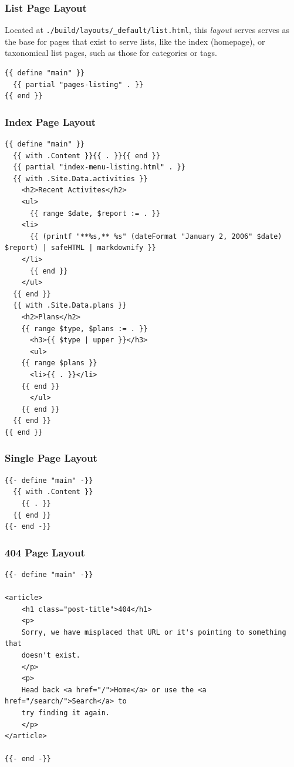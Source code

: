 \documentclass[11pt]{article}
\begin{document}
\subsubsection*{List Page Layout}
\label{sec:org9b11226}
Located at \texttt{./build/layouts/\_default/list.html}, this \emph{layout} serves
serves as the base for pages that exist to serve lists, like the index
(homepage), or taxonomical list pages, such as those for categories or
tags.
\begin{verbatim}
{{ define "main" }}
  {{ partial "pages-listing" . }}
{{ end }}
\end{verbatim}
\subsubsection*{Index Page Layout}
\label{sec:orge6c3772}
\begin{verbatim}
{{ define "main" }}
  {{ with .Content }}{{ . }}{{ end }}
  {{ partial "index-menu-listing.html" . }}
  {{ with .Site.Data.activities }}
    <h2>Recent Activites</h2>
    <ul>
      {{ range $date, $report := . }}
	<li>
	  {{ (printf "**%s,** %s" (dateFormat "January 2, 2006" $date) $report) | safeHTML | markdownify }}
	</li>
      {{ end }}
    </ul>
  {{ end }}
  {{ with .Site.Data.plans }}
    <h2>Plans</h2>
    {{ range $type, $plans := . }}
      <h3>{{ $type | upper }}</h3>
      <ul>
	{{ range $plans }}
	  <li>{{ . }}</li>
	{{ end }}
      </ul>
    {{ end }}
  {{ end }}
{{ end }}
\end{verbatim}
\subsubsection*{Single Page Layout}
\label{sec:org96a8a0e}
\begin{verbatim}
{{- define "main" -}}
  {{ with .Content }}
    {{ . }}
  {{ end }}
{{- end -}}
\end{verbatim}
\subsubsection*{404 Page Layout}
\label{sec:org2663113}
\begin{verbatim}
{{- define "main" -}}

<article>
    <h1 class="post-title">404</h1>
    <p>
	Sorry, we have misplaced that URL or it's pointing to something that
	doesn't exist.
    </p>
    <p>
	Head back <a href="/">Home</a> or use the <a href="/search/">Search</a> to
	try finding it again.
    </p>
</article>

{{- end -}}
\end{verbatim}
\stopcontents[level-2]
\end{document}
